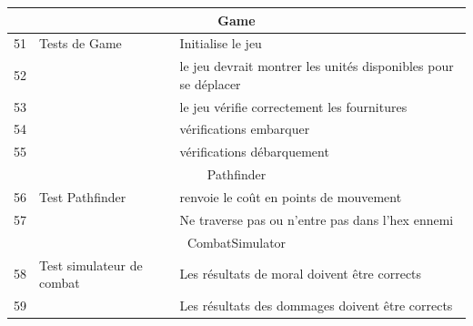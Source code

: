 \begin{center}
\begin{tabular}{|l|l|l|}
        \hline
        \multicolumn{3}{c}{Game}                                                                               \\
        \hline
        51 & Tests de Game                & Initialise le jeu                                                  \\
        52 &                              & le jeu devrait montrer les unités disponibles pour se déplacer     \\
        53 &                              & le jeu vérifie correctement les fournitures                        \\
        54 &                              & vérifications embarquer                                            \\
        55 &                              & vérifications débarquement                                         \\
        \hline
        \multicolumn{3}{c}{Pathfinder}                                                                         \\
        \hline
        56 & Test Pathfinder              & renvoie le coût en points de mouvement                             \\ %
        57 &                              & Ne traverse pas ou n'entre pas dans l'hex ennemi                   \\
        \hline
        \multicolumn{3}{c}{CombatSimulator}                                                                    \\
        \hline
        58 & Test  simulateur de combat   & Les résultats de moral doivent être corrects                       \\
        59 &                              & Les résultats des dommages doivent être corrects                   \\
        \hline
    \end{tabular}
\end{center}
